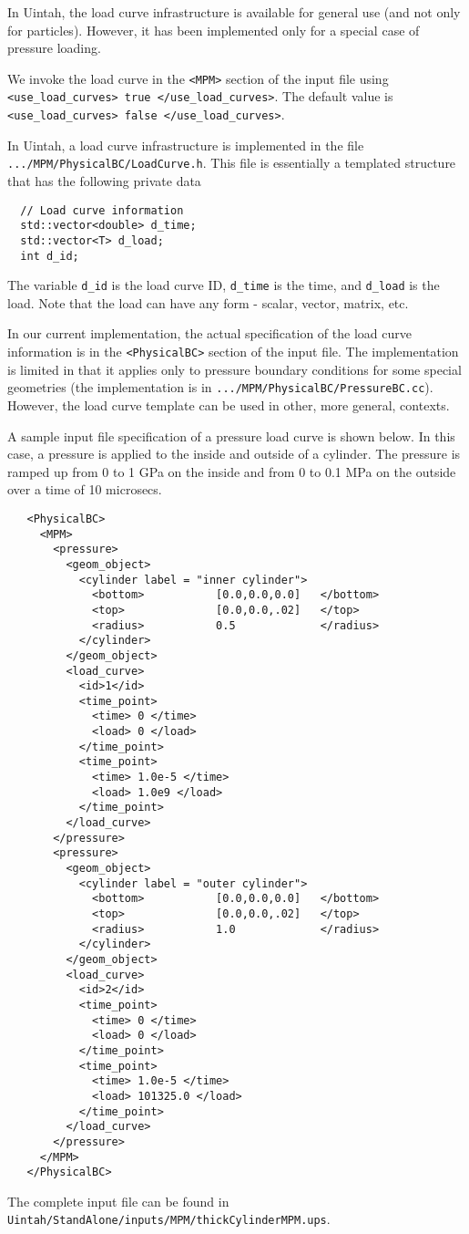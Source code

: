 In Uintah, the load curve infrastructure is available for general use
(and not only for particles).  However, it has been implemented only for
a special case of pressure loading.

We invoke the load curve in the \verb|<MPM>| section of the input file
using  \verb|<use_load_curves> true </use_load_curves>|.  The default value 
is \verb|<use_load_curves> false </use_load_curves>|.

In Uintah, a load curve infrastructure is implemented in the file
\verb|.../MPM/PhysicalBC/LoadCurve.h|.  This file is essentially a templated
structure that has the following private data
\begin{lstlisting}
  // Load curve information 
  std::vector<double> d_time;
  std::vector<T> d_load;
  int d_id;
\end{lstlisting}
The variable \verb|d_id| is the load curve ID, \verb|d_time| is the time,
and \verb|d_load| is the load.  Note that the load can have any form - scalar,
vector, matrix, etc.

In our current implementation, the actual specification of the load curve 
information is in the \verb|<PhysicalBC>| section of the input file.  The
implementation is limited in that it applies only to pressure boundary 
conditions for some special geometries (the implementation is in 
\verb|.../MPM/PhysicalBC/PressureBC.cc|).  However, the load curve template can
be used in other, more general, contexts.

A sample input file specification of a pressure load curve is shown below.
In this case, a pressure is applied to the inside and outside of a cylinder.
The pressure is ramped up from 0 to 1 GPa on the inside and from 0 to 0.1 MPa
on the outside over a time of 10 microsecs. 
\begin{lstlisting}
   <PhysicalBC>
     <MPM>
       <pressure>
         <geom_object>
           <cylinder label = "inner cylinder">
             <bottom>           [0.0,0.0,0.0]   </bottom>
             <top>              [0.0,0.0,.02]   </top>
             <radius>           0.5             </radius>
           </cylinder>
         </geom_object>
         <load_curve>
           <id>1</id>
           <time_point>
             <time> 0 </time>
             <load> 0 </load>
           </time_point>
           <time_point>
             <time> 1.0e-5 </time>
             <load> 1.0e9 </load>
           </time_point>
         </load_curve>
       </pressure>
       <pressure>
         <geom_object>
           <cylinder label = "outer cylinder">
             <bottom>           [0.0,0.0,0.0]   </bottom>
             <top>              [0.0,0.0,.02]   </top>
             <radius>           1.0             </radius>
           </cylinder>
         </geom_object>
         <load_curve>
           <id>2</id>
           <time_point>
             <time> 0 </time>
             <load> 0 </load>
           </time_point>
           <time_point>
             <time> 1.0e-5 </time>
             <load> 101325.0 </load>
           </time_point>
         </load_curve>
       </pressure>
     </MPM>
   </PhysicalBC>
\end{lstlisting}
The complete input file can be found in \verb|Uintah/StandAlone/inputs/MPM/thickCylinderMPM.ups|.


%







